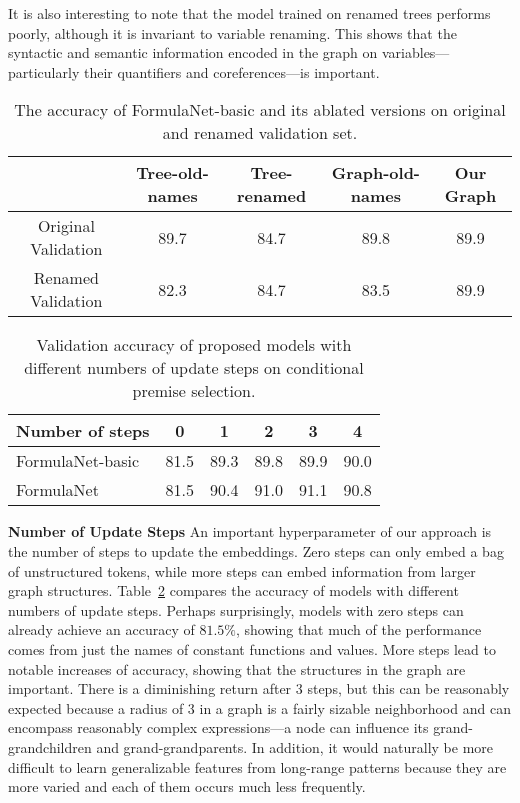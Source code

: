 \documentclass{article}
\begin{document}
It is also interesting to note that the model trained on renamed trees performs poorly,
although it is invariant to variable renaming. This shows that the syntactic and semantic
information encoded in the graph on variables---particularly their quantifiers and
coreferences---is important.  

\begin{table}[t]
\caption{The accuracy of FormulaNet-basic and its ablated versions on original and renamed validation set. }
	\centering
	\vspace{-1mm}
	\begin{tabular}{c c c c c }\hline
	 & Tree-old-names & Tree-renamed & Graph-old-names & Our Graph \\ \hline
	Original Validation & 89.7 & 84.7 & 89.8 & 89.9\\ 
	Renamed Validation & 82.3 & 84.7 & 83.5 & 89.9\\ \hline
	\end{tabular}
	\label{tab:rename}
\end{table} 

\begin{table}[t]
	\caption{Validation accuracy of proposed models with different numbers of update steps on conditional premise selection.}
	\centering
	\vspace{-2mm}
	\begin{tabular}{l c c c c c }
	\hline
	Number of steps & 0 & 1 & 2 & 3 & 4 \\ \hline
	FormulaNet-basic  & 81.5 & 89.3 & 89.8 & 89.9 & 90.0 \\ 
	FormulaNet & 81.5 & 90.4 & 91.0 & 91.1 & 90.8 \\
	\hline
	\end{tabular}
	\label{tab:multisteps}
	\vspace{-4mm}
\end{table}

\noindent \textbf{Number of Update Steps}
An important hyperparameter of our approach is the number of steps to update the
embeddings. Zero steps can only embed a bag of unstructured tokens, while more steps can
embed information from larger graph structures. Table~\ref{tab:multisteps} compares the accuracy of models with different numbers of
update steps. Perhaps surprisingly, models with zero steps can already achieve an accuracy of 
$81.5\%$, showing that much of the performance comes from just the names of 
constant functions and values. More steps lead to notable increases of accuracy, showing that the
structures in the graph are important. There is a diminishing return after 3 steps, but
this can be reasonably expected because a
radius of 3 in a graph is a fairly sizable neighborhood and can encompass reasonably complex
expressions---a node can influence its grand-grandchildren and
grand-grandparents. In addition, it would naturally be more difficult to learn generalizable
features from long-range patterns because they are more varied and each of them occurs
much less frequently. 
\end{document}
